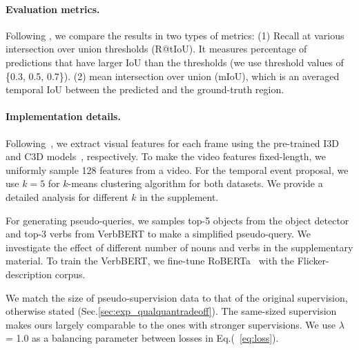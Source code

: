 \vspace{-1em}\paragraph{Evaluation metrics.}
\label{sec:experiment:metric}
Following \cite{gao2017tall}, we compare the results in two types of metrics: (1) Recall at various intersection over union thresholds (R@tIoU). It measures percentage of predictions that have larger IoU than the thresholds (we use threshold values of \{0.3, 0.5, 0.7\}). (2) mean intersection over union (mIoU), which is an averaged temporal IoU between the predicted and the ground-truth region.

\vspace{-1em}\paragraph{Implementation details.}
\label{sec:experiment:implementation_details}
Following~\cite{mun2020LGI,opazo2021dori}, we extract visual features for each frame using the pre-trained I3D~\cite{i3d} and C3D models~\cite{c3d}, respectively. 
To make the video features fixed-length, we uniformly sample 128 features from a video.
For the temporal event proposal, we use $k=5$ for $k$-means clustering algorithm for both datasets.
We provide a detailed analysis for different $k$ in the supplement.

For generating pseudo-queries, we samples top-5 objects from the object detector and top-3 verbs from VerbBERT to make a simplified pseudo-query. 
We investigate the effect of different number of nouns and verbs in the supplementary material. %
To train the VerbBERT, we fine-tune RoBERTa~\cite{roberta} with the Flicker-description corpus.

We match the size of pseudo-supervision data to that of the original supervision, otherwise stated (Sec.\ref{sec:exp_qualquantradeoff}).
The same-sized supervision makes ours largely comparable to the ones with stronger supervisions.
We use $\lambda$ = 1.0 as a balancing parameter between losses in Eq.(~\ref{eq:loss}).

